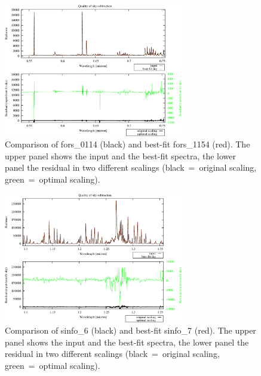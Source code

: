 \begin{figure}
\centering
\includegraphics[width=0.7\textwidth,clip=true]{figures/TEST-FORS-4_fit.pdf}
\caption[]{Comparison of fors\_0114 (black) and best-fit fors\_1154 (red). The
upper panel shows the input and the best-fit spectra, the lower panel the
residual in two different scalings (black~=~original scaling, green~=~optimal
scaling).}
\label{fig:fors_4}
\end{figure}

\begin{figure}
\centering
\includegraphics[width=0.7\textwidth,clip=true]{figures/TEST-SINFO-J_fit.pdf}
\caption[]{Comparison of sinfo\_6 (black) and best-fit sinfo\_7 (red). The
upper panel shows the input and the best-fit spectra, the lower panel the
residual in two different scalings (black~=~original scaling, green~=~optimal
scaling).}
\label{fig:sinfo_J}
\end{figure}

